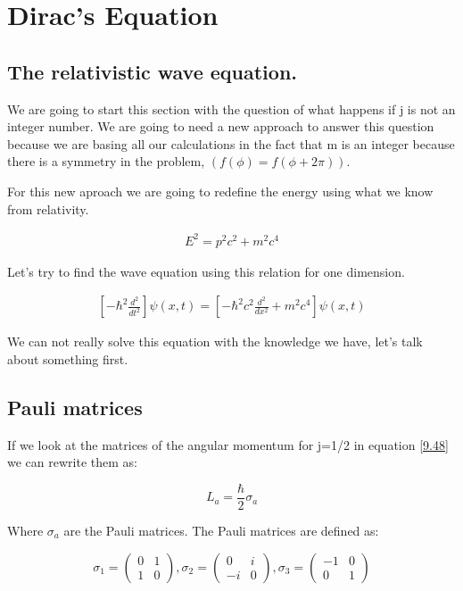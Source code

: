 \setchapterpreamble[u]{\margintoc}
\chapter{Dirac's Equation}


\section{The relativistic wave equation.}

We are going to start this section with the question of what happens if j is not an integer number. We are going to need a new approach to answer this question because we are basing all our calculations in the fact that m is an integer because there is a symmetry in the problem, $(f(\phi)=f(\phi+2\pi))$.

For this new aproach we are going to redefine the energy using what we know from relativity.

\begin{equation}
  \begin{array}{c}
    E^2 = p^2c^2 + m^2c^4
  \end{array}
\end{equation}

Let's try to find the wave equation using this relation for one dimension.

\begin{equation}
  \begin{array}{c}
   \left[-\hbar^2\frac{d^2}{dt^2}\right]\psi(x,t) = \left[- \hbar^2c^2\frac{d^2}{dx^2}+m^2c^4\right]\psi(x,t)
  \end{array}
\end{equation}

We can not really solve this equation with the knowledge we have, let's talk about something first.

\section{Pauli matrices}

If we look at the matrices of the angular momentum for j=1/2 in equation \ref{9.48} we can rewrite them as:

\begin{equation}
  L_a =\frac{\hbar}{2} \sigma_a
\end{equation}

Where $\sigma_a$ are the Pauli matrices. The Pauli matrices are defined as:

\begin{equation}
  \sigma_1 = \begin{pmatrix}
    0 & 1 \\
    1 & 0
  \end{pmatrix},
  \sigma_2 = \begin{pmatrix}
    0 & i \\
    -i & 0
  \end{pmatrix},
  \sigma_3 = \begin{pmatrix}
    -1 & 0 \\
    0 & 1
  \end{pmatrix}
\end{equation}

